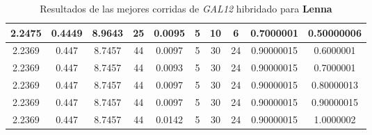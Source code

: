 \begin{table}[h!]
\begin{center}
\begin{tabular}{|c|c|c|c|c|c|c|c|c|c|}
        \hline
            2.2475 & 0.4449  & 8.9643 & 25 & 0.0095 & 5 & 10 & 6 & 0.7000001 & 0.50000006\\
        \hline
        \hline
            2.2369 & 0.447  & 8.7457 & 44 & 0.0097 & 5 & 30 & 24 & 0.90000015 & 0.6000001\\
        \hline
        \hline
            2.2369 & 0.447  & 8.7457 & 44 & 0.0093 & 5 & 30 & 24 & 0.90000015 & 0.7000001\\
        \hline
        \hline
            2.2369 & 0.447  & 8.7457 & 44 & 0.0097 & 5 & 30 & 24 & 0.90000015 & 0.80000013\\
        \hline
        \hline
            2.2369 & 0.447  & 8.7457 & 44 & 0.0097 & 5 & 30 & 24 & 0.90000015 & 0.90000015\\
        \hline
        \hline
            2.2369 & 0.447  & 8.7457 & 44 & 0.0142 & 5 & 30 & 24 & 0.90000015 & 1.0000002\\
        \hline
        \end{tabular}
        \caption{Resultados de las mejores corridas de \emph{GAL12} hibridado para {\bf Lenna}}
        \label{tb:tableGAL12}
    \end{center}
\end{table}
